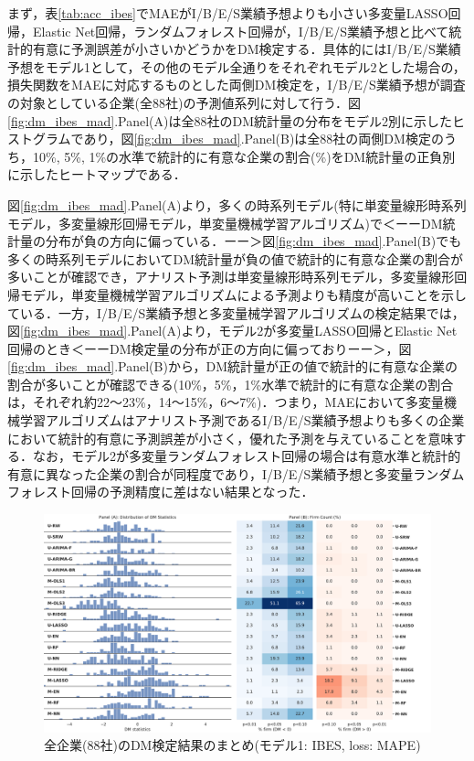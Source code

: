 \documentclass[a4paper，12pt]{jsarticle}
\begin{document}
まず，表\ref{tab:acc_ibes}でMAEがI/B/E/S業績予想よりも小さい多変量LASSO回帰，Elastic Net回帰，ランダムフォレスト回帰が，I/B/E/S業績予想と比べて統計的有意に予測誤差が小さいかどうかをDM検定する．具体的にはI/B/E/S業績予想をモデル1として，その他のモデル全通りをそれぞれモデル2とした場合の，損失関数をMAEに対応するものとした両側DM検定を，I/B/E/S業績予想が調査の対象としている企業(全88社)の予測値系列に対して行う．図\ref{fig:dm_ibes_mad}.Panel(A)は全88社のDM統計量の分布をモデル2別に示したヒストグラムであり，図\ref{fig:dm_ibes_mad}.Panel(B)は全88社の両側DM検定のうち，10\%, 5\%, 1\%の水準で統計的に有意な企業の割合(\%)をDM統計量の正負別に示したヒートマップである．

図\ref{fig:dm_ibes_mad}.Panel(A)より，多くの時系列モデル(特に単変量線形時系列モデル，多変量線形回帰モデル，単変量機械学習アルゴリズム)で＜ーーDM統計量の分布が負の方向に偏っている．ーー＞図\ref{fig:dm_ibes_mad}.Panel(B)でも多くの時系列モデルにおいてDM統計量が負の値で統計的に有意な企業の割合が多いことが確認でき，アナリスト予測は単変量線形時系列モデル，多変量線形回帰モデル，単変量機械学習アルゴリズムによる予測よりも精度が高いことを示している．一方，I/B/E/S業績予想と多変量械学習アルゴリズムの検定結果では，図\ref{fig:dm_ibes_mad}.Panel(A)より，モデル2が多変量LASSO回帰とElastic Net回帰のとき＜ーーDM検定量の分布が正の方向に偏っておりーー＞，図\ref{fig:dm_ibes_mad}.Panel(B)から，DM統計量が正の値で統計的に有意な企業の割合が多いことが確認できる(10\%，5\%，1\%水準で統計的に有意な企業の割合は，それぞれ約22～23\%，14～15\%，6～7\%)．つまり，MAEにおいて多変量機械学習アルゴリズムはアナリスト予測であるI/B/E/S業績予想よりも多くの企業において統計的有意に予測誤差が小さく，優れた予測を与えていることを意味する．なお，モデル2が多変量ランダムフォレスト回帰の場合は有意水準と統計的有意に異なった企業の割合が同程度であり，I/B/E/S業績予想と多変量ランダムフォレスト回帰の予測精度に差はない結果となった．

\begin{figure}
  \centering
  \caption{全企業(88社)のDM検定結果のまとめ(モデル1: IBES, loss: MAPE)}
  \label{fig:dm_ibes_mape}
  \includegraphics[width=15cm]{./img/_dm_MAPE_y_hat_ibes.pdf}
\end{figure}
\end{document}
